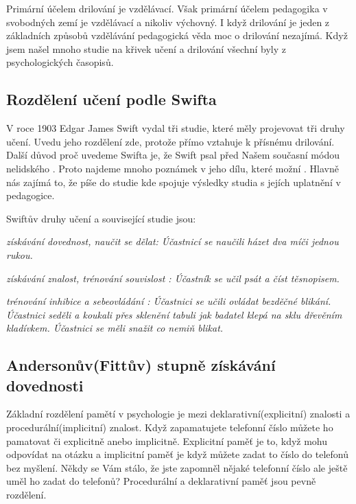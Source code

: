 Primární účelem drilování je vzdělávací.  Však primární účelem pedagogika v svobodných zemí je vzdělávací a nikoliv výchovný. I když drilování je jeden z základních způsobů vzdělávání pedagogická věda moc o drilování nezajímá. Když jsem našel mnoho studie na křivek učení a drilování všechní byly z psychologických časopisů.

\subsection{Rozdělení učení podle Swifta}

V roce 1903 Edgar James Swift vydal tři studie, které měly projevovat tři druhy učení. Uvedu jeho rozdělení zde, protože přímo vztahuje k přísnému drilování.  Další důvod proč uvedeme Swifta je, že Swift psal před Našem současní módou nelidského .  Proto najdeme mnoho poznámek v jeho dílu, které možní .  Hlavně nás zajímá to, že píše do studie  kde spojuje výsledky studia s jejích uplatnění v pedagogice. %

Swiftův druhy učení a související studie jsou:

\em získávání dovednost, naučit se dělat\em : Účastnicí se naučili házet dva míči jednou rukou. %

\em získávání znalost, trénování souvislost \em : Účastník se učil psát a číst těsnopisem.  %

\em trénování inhibice a sebeovládání \em : Účastnici se učili ovládat bezděčné blikání. Účastnici seděli a koukali přes sklenění tabuli jak badatel klepá na sklu dřevěním kladívkem.  Účastnici se měli snažit co nemiň blikat.  %

\citep[str.201,224,230,231]{swift1903studies}

\subsection{Andersonův(Fittův) stupně získávání dovednosti} %

Základní rozdělení pamětí v psychologie je mezi deklarativní(explicitní) znalosti a procedurální(implicitní) znalost.  Když zapamatujete telefonní číslo můžete ho pamatovat či explicitně anebo implicitně. Explicitní paměť je to, když mohu odpovídat na otázku  a implicitní paměť je když můžete zadat to číslo do telefonů bez myšlení. Někdy se Vám stálo, že jste zapomněl nějaké telefonní číslo ale ještě uměl ho zadat do telefonů?  Procedurální a deklarativní paměť jsou pevně rozdělení.

